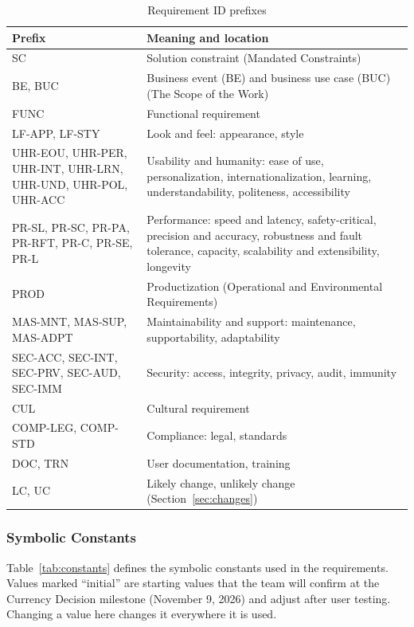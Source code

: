 \documentclass[12pt]{article}
\newcommand{\acr}[3]{\phantomsection\label{acr:#1}#2 (#3)}
\begin{document}
\begin{table}[H]
\centering
\small
\begin{tabularx}{\textwidth}{|p{2.6cm}|X|}
\hline
\textbf{Prefix} & \textbf{Meaning and location} \\
\hline
SC & Solution constraint (Mandated Constraints) \\
BE, BUC & \acr{BE}{Business event}{BE} and \acr{BUC}{business use case}{BUC} (The Scope of the Work) \\
FUNC & Functional requirement \\
LF-APP, LF-STY & Look and feel: appearance, style \\
UHR-EOU, UHR-PER, UHR-INT, UHR-LRN, UHR-UND, UHR-POL, UHR-ACC & Usability and humanity: ease of use, personalization, internationalization, learning, understandability, politeness, accessibility \\
PR-SL, PR-SC, PR-PA, PR-RFT, PR-C, PR-SE, PR-L & Performance: speed and latency, safety-critical, precision and accuracy, robustness and fault tolerance, capacity, scalability and extensibility, longevity \\
PROD & Productization (Operational and Environmental Requirements) \\
MAS-MNT, MAS-SUP, MAS-ADPT & Maintainability and support: maintenance, supportability, adaptability \\
SEC-ACC, SEC-INT, SEC-PRV, SEC-AUD, SEC-IMM & Security: access, integrity, privacy, audit, immunity \\
CUL & Cultural requirement \\
COMP-LEG, COMP-STD & Compliance: legal, standards \\
DOC, TRN & User documentation, training \\
LC, UC & Likely change, unlikely change (Section~\ref{sec:changes}) \\
\hline
\end{tabularx}
\caption{Requirement ID prefixes}
\label{tab:id-prefixes}
\end{table}

\subsubsection{Symbolic Constants}

Table~\ref{tab:constants} defines the symbolic constants used in the
requirements. Values marked ``initial'' are starting values that the team will
confirm at the Currency Decision milestone (November 9, 2026) and adjust after
user testing. Changing a value here changes it everywhere it is used.
\end{document}

